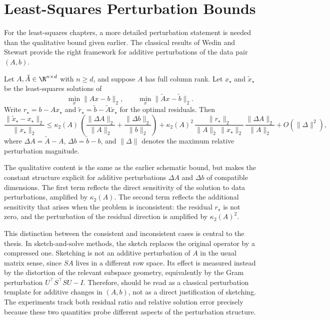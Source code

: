 \section{Least-Squares Perturbation Bounds}

For the least-squares chapters, a more detailed perturbation statement is
needed than the qualitative bound given earlier. The classical results of
Wedin and Stewart provide the right framework for additive perturbations of the
data pair \((A,b)\).

\begin{theorem}
	\label{thm:wedin}
	Let \(A, \tilde A \in \R^{n \times d}\) with \(n \ge d\), and suppose \(A\)
	has full column rank. Let \(x_\star\) and \(\tilde x_\star\) be the
	least-squares solutions of
	\[
		\min_x \|Ax - b\|_2, \qquad \min_x \|\tilde A x - \tilde b\|_2.
	\]
	Write \(r_\star = b - Ax_\star\) and \(\tilde r_\star = \tilde b - \tilde A
	\tilde x_\star\) for the optimal residuals. Then
	\[
		\frac{\|\tilde x_\star - x_\star\|_2}{\|x_\star\|_2}
		\le
		\kappa_2(A)\,
		\left(
		\frac{\|\Delta A\|_2}{\|A\|_2}
		+
		\frac{\|\Delta b\|_2}{\|b\|_2}
		\right)
		+
		\kappa_2(A)^2\,
		\frac{\|r_\star\|_2}{\|A\|_2\,\|x_\star\|_2}\,
		\frac{\|\Delta A\|_2}{\|A\|_2}
		+
		O\!\left(\|\Delta\|^2\right),
	\]
	where \(\Delta A = \tilde A - A\), \(\Delta b = \tilde b - b\), and
	\(\|\Delta\|\) denotes the maximum relative perturbation magnitude.
\end{theorem}

The qualitative content is the same as the earlier schematic bound, but
 makes the constant structure explicit for additive
perturbations \(\Delta A\) and \(\Delta b\) of compatible dimensions. The first
term reflects the direct sensitivity of the solution to data perturbations,
amplified by \(\kappa_2(A)\). The second term reflects the additional
sensitivity that arises when the problem is inconsistent: the residual
\(r_\star\) is not zero, and the perturbation of the residual direction is
amplified by \(\kappa_2(A)^2\).

This distinction between the consistent and inconsistent cases is central to
the thesis. In sketch-and-solve methods, the sketch replaces the original
operator by a compressed one. Sketching is not an additive perturbation of \(A\)
in the usual matrix sense, since \(SA\) lives in a different row space. Its
effect is measured instead by the distortion of the relevant subspace geometry,
equivalently by the Gram perturbation \(U^\top S^\top S U - I\). Therefore,
 should be read as a classical perturbation template for
additive changes in \((A,b)\), not as a direct justification of sketching. The
experiments track both residual ratio and relative solution error precisely
because these two quantities probe different aspects of the perturbation
structure.

